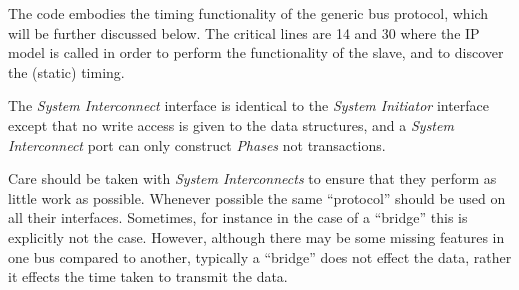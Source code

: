 \documentclass[12pt,oneside]{gsbook}
\newcommand{\master}{{\em System Initiator}\xspace}
\newcommand{\router}{{\em System Interconnect}\xspace}
\newcommand{\routers}{{\em System Interconnects}\xspace}
\newcommand{\atoms}{{\em Phases}\xspace}
\begin{document}
The code embodies the timing functionality of the generic bus
protocol, which will be further discussed below. The critical lines
are 14 and 30 where the IP model is called in order to perform the
functionality of the slave, and to discover the (static) timing. 

The \router interface is identical to the \master interface except that no write access is given to
the data structures, and a \router port can only construct \atoms not transactions.

Care should be taken with \routers to ensure that they perform as little work as possible. Whenever
possible the same ``protocol'' should be used on all their interfaces. Sometimes, for instance in
the case of a ``bridge'' this is explicitly not the case. However, although there may be some
missing features in one bus compared to another, typically a ``bridge'' does not effect the data,
rather it effects the time taken to transmit the data.








\end{document}

